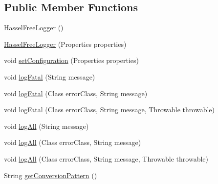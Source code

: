 \subsection*{Public Member Functions}
\begin{DoxyCompactItemize}
\item 
\mbox{\hyperlink{classnet_1_1dlinkddns_1_1atulsaurabh_1_1hasselfreelogger_1_1impl_1_1_hassel_free_logger_a603e83e38bc2c011dd3e5edf074acb1d}{Hassel\+Free\+Logger}} ()
\item 
\mbox{\hyperlink{classnet_1_1dlinkddns_1_1atulsaurabh_1_1hasselfreelogger_1_1impl_1_1_hassel_free_logger_a1210504fcaba4ae6c3283c0fc0882380}{Hassel\+Free\+Logger}} (Properties properties)
\item 
void \mbox{\hyperlink{classnet_1_1dlinkddns_1_1atulsaurabh_1_1hasselfreelogger_1_1impl_1_1_hassel_free_logger_a9dbc7356642960679aaa76cc054ce456}{set\+Configuration}} (Properties properties)
\item 
void \mbox{\hyperlink{classnet_1_1dlinkddns_1_1atulsaurabh_1_1hasselfreelogger_1_1impl_1_1_hassel_free_logger_a478d877ebdbb5cb2796ad23d0dafe369}{log\+Fatal}} (String message)
\item 
void \mbox{\hyperlink{classnet_1_1dlinkddns_1_1atulsaurabh_1_1hasselfreelogger_1_1impl_1_1_hassel_free_logger_a40d4e893854bc742145dbf2fe5d2aa43}{log\+Fatal}} (Class error\+Class, String message)
\item 
void \mbox{\hyperlink{classnet_1_1dlinkddns_1_1atulsaurabh_1_1hasselfreelogger_1_1impl_1_1_hassel_free_logger_a546bc74e8eec8333893e294a98bbe939}{log\+Fatal}} (Class error\+Class, String message, Throwable throwable)
\item 
void \mbox{\hyperlink{classnet_1_1dlinkddns_1_1atulsaurabh_1_1hasselfreelogger_1_1impl_1_1_hassel_free_logger_af433939b275c708e5334f56a6444e2af}{log\+All}} (String message)
\item 
void \mbox{\hyperlink{classnet_1_1dlinkddns_1_1atulsaurabh_1_1hasselfreelogger_1_1impl_1_1_hassel_free_logger_ade5a00300f3406a3a64ca003b1799dbd}{log\+All}} (Class error\+Class, String message)
\item 
void \mbox{\hyperlink{classnet_1_1dlinkddns_1_1atulsaurabh_1_1hasselfreelogger_1_1impl_1_1_hassel_free_logger_a6b63592b0c825713f2bc861b6d487df8}{log\+All}} (Class error\+Class, String message, Throwable throwable)
\item 
String \mbox{\hyperlink{classnet_1_1dlinkddns_1_1atulsaurabh_1_1hasselfreelogger_1_1impl_1_1_hassel_free_logger_a8309e8b9abe877ce11e6b04faf48e8c1}{get\+Conversion\+Pattern}} ()

\end{DoxyCompactItemize}
